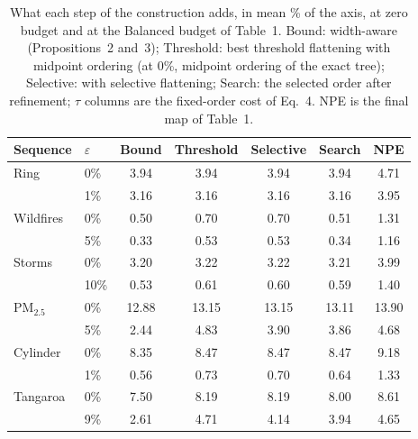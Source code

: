 \begin{table}[!htb]
\centering
\caption{What each step of the construction adds, in mean \% of the axis, at zero budget and at the Balanced budget of Table~1. Bound: width-aware (Propositions~2 and~3); Threshold: best threshold flattening with midpoint ordering (at 0\%, midpoint ordering of the exact tree); Selective: with selective flattening; Search: the selected order after refinement; $\tau$ columns are the fixed-order cost of Eq.~4. NPE is the final map of Table~1.}
\label{tab:ablation}
\footnotesize
\setlength{\tabcolsep}{3pt}
\begin{tabular}{@{}llccccc@{}}
\toprule
Sequence & $\varepsilon$ & Bound & Threshold & Selective & Search & NPE \\
\midrule
Ring & 0\% & 3.94 & 3.94 & 3.94 & 3.94 & 4.71 \\
 & 1\% & 3.16 & 3.16 & 3.16 & 3.16 & 3.95 \\
Wildfires & 0\% & 0.50 & 0.70 & 0.70 & 0.51 & 1.31 \\
 & 5\% & 0.33 & 0.53 & 0.53 & 0.34 & 1.16 \\
Storms & 0\% & 3.20 & 3.22 & 3.22 & 3.21 & 3.99 \\
 & 10\% & 0.53 & 0.61 & 0.60 & 0.59 & 1.40 \\
PM$_{2.5}$ & 0\% & 12.88 & 13.15 & 13.15 & 13.11 & 13.90 \\
 & 5\% & 2.44 & 4.83 & 3.90 & 3.86 & 4.68 \\
Cylinder & 0\% & 8.35 & 8.47 & 8.47 & 8.47 & 9.18 \\
 & 1\% & 0.56 & 0.73 & 0.70 & 0.64 & 1.33 \\
Tangaroa & 0\% & 7.50 & 8.19 & 8.19 & 8.00 & 8.61 \\
 & 9\% & 2.61 & 4.71 & 4.14 & 3.94 & 4.65 \\
\bottomrule
\end{tabular}
\end{table}
